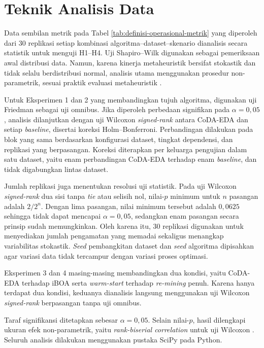 \section{Teknik Analisis Data}

Data sembilan metrik pada Tabel \ref{tab:definisi-operasional-metrik} yang diperoleh dari 30 replikasi setiap kombinasi algoritma–dataset–skenario dianalisis secara statistik untuk menguji H1–H4. 
Uji Shapiro–Wilk digunakan sebagai pemeriksaan awal distribusi data. 
Namun, karena kinerja metaheuristik bersifat stokastik dan tidak selalu berdistribusi normal, analisis utama menggunakan prosedur non-parametrik, sesuai praktik evaluasi metaheuristik \parencite{omran_permutation_2022}.

Untuk Eksperimen 1 dan 2 yang membandingkan tujuh algoritma, digunakan uji Friedman sebagai uji omnibus. 
Jika diperoleh perbedaan signifikan pada $\alpha=0{,}05$, analisis dilanjutkan dengan uji Wilcoxon \textit{signed-rank} antara CoDA-EDA dan setiap \textit{baseline}, disertai koreksi Holm–Bonferroni. 
Perbandingan dilakukan pada blok yang sama berdasarkan konfigurasi dataset, tingkat dependensi, dan replikasi yang berpasangan. 
Koreksi diterapkan per keluarga pengujian dalam satu dataset, yaitu enam perbandingan CoDA-EDA terhadap enam \textit{baseline}, dan tidak digabungkan lintas dataset.

Jumlah replikasi juga menentukan resolusi uji statistik. 
Pada uji Wilcoxon \textit{signed-rank} dua sisi tanpa \textit{tie} atau selisih nol, nilai-$p$\label{first:symbol-p} minimum untuk $n$ pasangan adalah $2/2^n$. Dengan lima pasangan, nilai minimum tersebut adalah $0,0625$ sehingga tidak dapat mencapai $\alpha=0{,}05$, sedangkan enam pasangan secara prinsip sudah memungkinkan. 
Oleh karena itu, 30 replikasi digunakan untuk menyediakan jumlah pengamatan yang memadai sekaligus menangkap variabilitas stokastik. 
\textit{Seed} pembangkitan dataset dan \textit{seed} algoritma dipisahkan agar variasi data tidak tercampur dengan variasi proses optimasi.

Eksperimen 3 dan 4 masing-masing membandingkan dua kondisi, yaitu CoDA-EDA terhadap iBOA serta \textit{warm-start} terhadap \textit{re-mining} penuh. 
Karena hanya terdapat dua kondisi, keduanya dianalisis langsung menggunakan uji Wilcoxon \textit{signed-rank} berpasangan tanpa uji omnibus.

Taraf signifikansi ditetapkan sebesar $\alpha=0{,}05$. Selain nilai-$p$, hasil dilengkapi ukuran efek non-parametrik, yaitu \textit{rank-biserial correlation} untuk uji Wilcoxon \parencite{peres_effect_2026}. 
Seluruh analisis dilakukan menggunakan pustaka SciPy pada Python.

